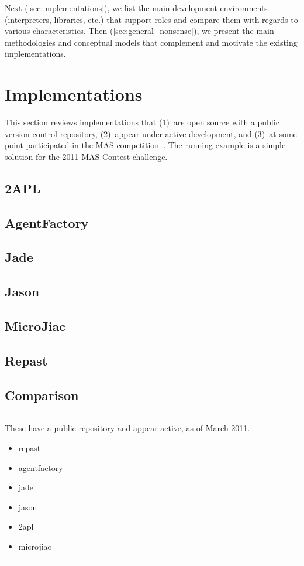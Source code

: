 \documentclass{article}
\newenvironment{notes}{\medskip\hrule\smallskip\narrower}{\smallskip\hrule\medskip}
\begin{document}
Next (\autoref{sec:implementations}), we list the main development environments (interpreters, libraries, etc.) that support roles and compare them with regards to various characteristics.
Then (\autoref{sec:general_nonsense}), we present the main methodologies and conceptual models  that complement and motivate the existing implementations.

\section{Implementations}\label{sec:implementations} %

This section reviews implementations that (1)~are open source with a public version control repository, (2)~appear under active development, and (3)~at some point participated in the MAS competition~\cite{site/mascontest}.
The running example is a simple solution for the 2011 MAS Contest challenge.

\subsection{2APL}

\subsection{AgentFactory}

\subsection{Jade}

\subsection{Jason}

\subsection{MicroJiac}

\subsection{Repast}

\subsection{Comparison}

\begin{notes}
These have a  public repository and appear active, as of March 2011.
\begin{itemize}
\item repast
\item agentfactory
\item jade
\item jason~\cite{books/sp/map2005/BordiniHV05}
\item 2apl
\item microjiac
\end{itemize}
\end{notes}
\end{document}
